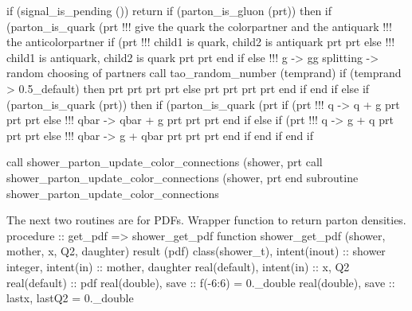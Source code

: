    if (signal_is_pending ()) return
    if (parton_is_gluon (prt)) then
       if (parton_is_quark (prt%
          !!! give the quark the colorpartner and the antiquark
          !!!     the anticolorpartner
          if (prt%
             !!! child1 is quark, child2 is antiquark
             prt%
             prt%
          else
             !!! child1 is antiquark, child2 is quark
             prt%
             prt%
          end if
       else
          !!! g -> gg splitting -> random choosing of partners
          call tao_random_number (temprand)
          if (temprand > 0.5_default) then
             prt%
             prt%
             prt%
             prt%
          else
             prt%
             prt%
             prt%
             prt%
          end if
       end if
    else if (parton_is_quark (prt)) then
       if (parton_is_quark (prt%
          if (prt%
             !!! q -> q + g
             prt%
             prt%
             prt%
          else
             !!! qbar -> qbar + g
             prt%
             prt%
             prt%
          end if
       else
          if (prt%
             !!! q -> g + q
             prt%
             prt%
             prt%
          else
             !!! qbar -> g + qbar
             prt%
             prt%
             prt%
          end if
       end if
    end if

    call shower_parton_update_color_connections (shower, prt%
    call shower_parton_update_color_connections (shower, prt%
  end subroutine shower_parton_update_color_connections

\eatline
\nwendcode{}The next two routines are for PDFs. Wrapper function to return
parton densities. 
\nwenddocs{}\plusendmoddef
  procedure :: get_pdf => shower_get_pdf
\nwendcode{}\plusendmoddef
  function shower_get_pdf (shower, mother, x, Q2, daughter) result (pdf)
    class(shower_t), intent(inout) :: shower
    integer, intent(in) :: mother, daughter
    real(default), intent(in) :: x, Q2
    real(default) :: pdf
    real(double), save :: f(-6:6) = 0._double
    real(double), save :: lastx, lastQ2 = 0._double


